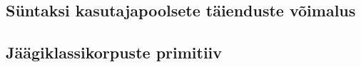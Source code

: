\documentclass[12pt]{article}
\begin{document}
    \subsection{Süntaksi kasutajapoolsete täienduste võimalus}
      
    \subsection{Jäägiklassikorpuste primitiiv}
      
\begin{comment}
operators
type operators (minimally for functions, either, pair).
abstract methods
move duplicate instance control into Naming module?
if-elif-else?
Class Test{T : Star} -> Class Test{_ : Star}
eta reduction warnings
unused type variable warnings
unused local variable warnings
add something for easily changing fields of structs?
internal: do something with old/new status tags. check where exactly they're necessary. get rid of them where they're useless
change semantics of missing pattern-match variables from blank to lambda? (Left -> e is not Left _ -> e but Left x -> e x)
internal: make the system of specifying built-in algebraic data types and things better and safer
Allow hiding things to functions outside module - so that helper functions are not exported from the module
normalising constructors for some data types (polynomial, fraction) which assume a certain normal form of fields?
allow to hide (prevent exporting) constructors and field accessors which can potentially have bad behavior
internal: remove locations from expressions except from lowest-level things where some checks are necessary (name)?
switch expression that is less strict and more flexible than match?
some limited pattern matching in function arguments (and maybe also variables introduced through algebraic matching?)
syntactic sugar for lists, vectors, matrices... allow writing (tiny, limited to expression parsing) language extensions?
fix the show-read issue; give a specific error for that (different errors for unresolved type variable and missing constr)
basic IO operations (output to console, read file, write file, append to file)
implement map and set (AVL trees?)
make match work with finite and char
different ways of folding lists, vectors, sets, maps etc
gather naming and type errors and give a list instead of returning only the first one?
enrich kind system via promotion
make match work with chars
make promotion for built-in ADT-s automatic
modify parser: make promotion of ints and chars to type level explicit (with !)

\end{comment}
\end{document}
